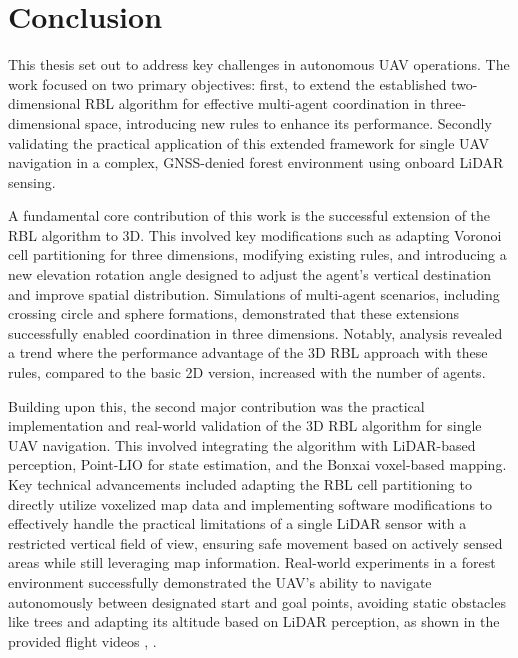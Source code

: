 
\chapter{Conclusion\label{chap:conclusion}}

This thesis set out to address key challenges in autonomous \ac{UAV} operations. 
The work focused on two primary objectives: first, to extend the established two-dimensional \ac{RBL} algorithm for effective multi-agent coordination in three-dimensional space, introducing new rules to enhance its performance. 
Secondly validating the practical application of this extended framework for single  \ac{UAV} navigation in a complex, GNSS-denied forest environment using onboard \ac{LiDAR} sensing.

A fundamental core contribution of this work is the successful extension of the \ac{RBL} algorithm to 3D.
This involved key modifications such as adapting Voronoi cell partitioning for three dimensions, modifying existing rules, and introducing a new elevation rotation angle designed to adjust the agent's vertical destination and improve spatial distribution. 
Simulations of multi-agent scenarios, including crossing circle and sphere formations, demonstrated that these extensions successfully enabled coordination in three dimensions. 
Notably, analysis revealed a trend where the performance advantage of the 3D \ac{RBL} approach with these rules, compared to the basic 2D version, increased with the number of agents.

Building upon this, the second major contribution was the practical implementation and real-world validation of the 3D \ac{RBL} algorithm for single  \ac{UAV} navigation. 
This involved integrating the algorithm with \ac{LiDAR}-based perception, Point-LIO for state estimation, and the Bonxai voxel-based mapping. 
Key technical advancements included adapting the \ac{RBL} cell partitioning to directly utilize voxelized map data and implementing software modifications to effectively handle the practical limitations of a single \ac{LiDAR} sensor with a restricted vertical field of view, ensuring safe movement based on actively sensed areas while still leveraging map information. 
Real-world experiments in a forest environment successfully demonstrated the  \ac{UAV}'s ability to navigate autonomously between designated start and goal points, avoiding static obstacles like trees and adapting its altitude based on \ac{LiDAR} perception, as shown in the provided flight videos \cite{aggressive_flight}, \cite{conservative_flight}.


